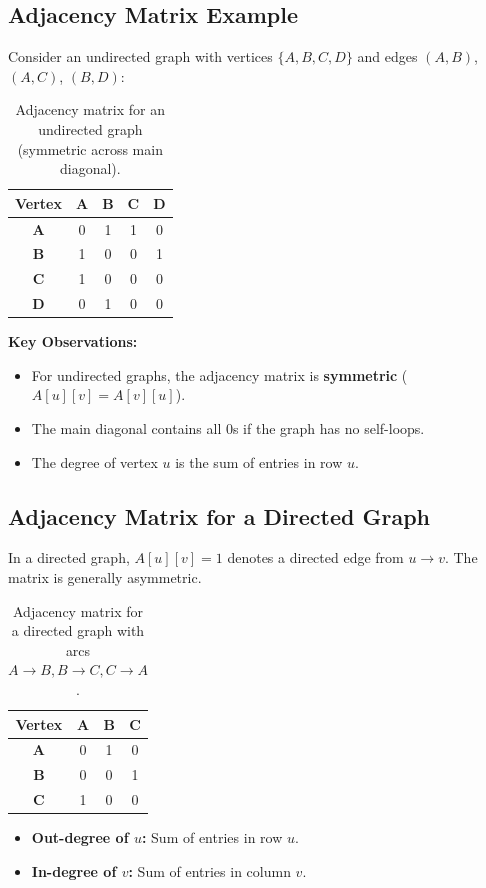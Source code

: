 \subsection{Adjacency Matrix Example}
Consider an undirected graph with vertices $\{A, B, C, D\}$ and edges $(A, B)$, $(A, C)$, $(B, D)$:

\begin{table}[htbp]
\centering
\small
\begin{tabular}{c c c c c}
\toprule
\textbf{Vertex} & \textbf{A} & \textbf{B} & \textbf{C} & \textbf{D} \\
\midrule
\textbf{A} & 0 & 1 & 1 & 0 \\
\textbf{B} & 1 & 0 & 0 & 1 \\
\textbf{C} & 1 & 0 & 0 & 0 \\
\textbf{D} & 0 & 1 & 0 & 0 \\
\bottomrule
\end{tabular}
\caption{Adjacency matrix for an undirected graph (symmetric across main diagonal).}
\end{table}

\textbf{Key Observations:}
\begin{itemize}
    \item For undirected graphs, the adjacency matrix is \textbf{symmetric} ($A[u][v] = A[v][u]$).
    \item The main diagonal contains all $0$s if the graph has no self-loops.
    \item The degree of vertex $u$ is the sum of entries in row $u$.
\end{itemize}

\subsection{Adjacency Matrix for a Directed Graph}
In a directed graph, $A[u][v] = 1$ denotes a directed edge from $u \to v$. The matrix is generally asymmetric.

\begin{table}[htbp]
\centering
\small
\begin{tabular}{c c c c}
\toprule
\textbf{Vertex} & \textbf{A} & \textbf{B} & \textbf{C} \\
\midrule
\textbf{A} & 0 & 1 & 0 \\
\textbf{B} & 0 & 0 & 1 \\
\textbf{C} & 1 & 0 & 0 \\
\bottomrule
\end{tabular}
\caption{Adjacency matrix for a directed graph with arcs $A \to B, B \to C, C \to A$.}
\end{table}
\begin{itemize}
    \item \textbf{Out-degree of $u$:} Sum of entries in row $u$.
    \item \textbf{In-degree of $v$:} Sum of entries in column $v$.
\end{itemize}

